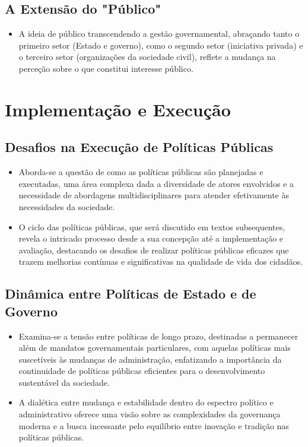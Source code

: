\documentclass[
   article,       
   12pt,          
   oneside,       
   a4paper,       
   english,       
   brazil,        
   sumario=tradicional
   ]{abntex2}
\begin{document}
\subsection{A Extensão do "Público"}
\begin{itemize}
    \item A ideia de público transcendendo a gestão governamental, abraçando tanto o primeiro setor (Estado e governo), como o segundo setor (iniciativa privada) e o terceiro setor (organizações da sociedade civil), reflete a mudança na perceção sobre o que constitui interesse público.
\end{itemize}

\section{Implementação e Execução}

\subsection{Desafios na Execução de Políticas Públicas}
\begin{itemize}
    \item Aborda-se a questão de como as políticas públicas são planejadas e executadas, uma área complexa dada a diversidade de atores envolvidos e a necessidade de abordagens multidisciplinares para atender efetivamente às necessidades da sociedade.
    \item O ciclo das políticas públicas, que será discutido em textos subsequentes, revela o intricado processo desde a sua concepção até a implementação e avaliação, destacando os desafios de realizar políticas públicas eficazes que trazem melhorias contínuas e significativas na qualidade de vida dos cidadãos.
\end{itemize}

\subsection{Dinâmica entre Políticas de Estado e de Governo}
\begin{itemize}
    \item Examina-se a tensão entre políticas de longo prazo, destinadas a permanecer além de mandatos governamentais particulares, com aquelas políticas mais suscetíveis às mudanças de administração, enfatizando a importância da continuidade de políticas públicas eficientes para o desenvolvimento sustentável da sociedade.
    \item A dialética entre mudança e estabilidade dentro do espectro político e administrativo oferece uma visão sobre as complexidades da governança moderna e a busca incessante pelo equilíbrio entre inovação e tradição nas políticas públicas.
\end{itemize}
\end{document}
